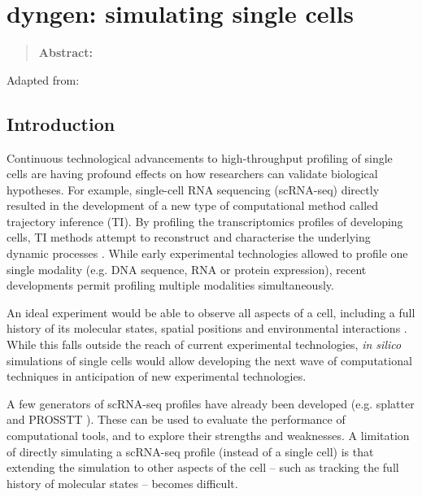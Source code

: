 \newpage{\thispagestyle{empty}\cleardoublepage}
\chapter{dyngen: simulating single cells} 
\label{chap:dyngen}

\begin{quote}
	\textbf{Abstract:} 
\end{quote}

\vfill

Adapted from:\\

\newpage

\section{Introduction}
Continuous technological advancements to high-throughput profiling of single cells
are having profound effects on how researchers can validate biological hypotheses. 
For example, single-cell RNA sequencing (scRNA-seq) directly resulted in the development
of a new type of computational method called trajectory inference (TI). By profiling
the transcriptomics profiles of developing cells, TI methods attempt to reconstruct 
and characterise the underlying dynamic processes \cite{cannoodt_computationalmethodstrajectory_2016}.
While early experimental technologies allowed to profile one single modality (e.g. DNA sequence, 
RNA or protein expression), recent developments permit profiling multiple modalities simultaneously.

An ideal experiment would be able to observe all aspects of a cell, including a full history of its 
molecular states, spatial positions and environmental interactions \cite{stuart_integrativesinglecellanalysis_2019}. 
While this falls outside the reach of current experimental technologies, \textit{in silico} simulations
of single cells would allow developing the next wave of computational techniques
in anticipation of new experimental technologies.

A few generators of scRNA-seq profiles have already been developed (e.g. splatter \cite{zappia_splattersimulationsinglecell_2017} and PROSSTT \cite{papadopoulos_prossttprobabilisticsimulation_2018}). These can be 
used to evaluate the performance of computational tools, and to explore their strengths and weaknesses. A limitation of directly simulating a scRNA-seq profile (instead of a single cell) is that extending the simulation to other aspects of the cell -- such as tracking the full history of molecular states -- becomes difficult.

